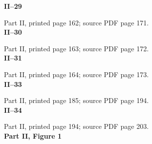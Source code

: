\documentclass[11pt,a4paper,oneside]{book}
\begin{document}
\vfill
\[

\]
\vfill
\newpage
\noindent\textbf{II--29}\par
\smallskip
Part II, printed page 162; source PDF page 171.
\vfill
\[

\]
\vfill
\newpage
\noindent\textbf{II--30}\par
\smallskip
Part II, printed page 163; source PDF page 172.
\vfill
\[

\]
\vfill
\newpage
\noindent\textbf{II--31}\par
\smallskip
Part II, printed page 164; source PDF page 173.
\vfill
\[

\]
\vfill
\newpage
\noindent\textbf{II--33}\par
\smallskip
Part II, printed page 185; source PDF page 194.
\vfill
\[

\]
\vfill
\newpage
\noindent\textbf{II--34}\par
\smallskip
Part II, printed page 194; source PDF page 203.
\vfill
\[

\]
\vfill
\newpage
\noindent\textbf{Part II, Figure 1}\par
\vfill
\begin{center}

\end{center}
\vfill
\end{document}
